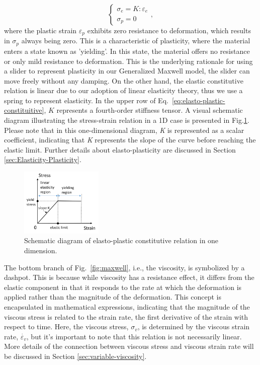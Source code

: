 \documentclass[10pt,journal,compsoc]{IEEEtran}
\begin{document}
\begin{equation}
	\begin{cases}
		\sigma_e = K:\varepsilon_e \\
		\sigma_p = 0
	\end{cases},\label{eq:elasto-plastic-constituitive}
\end{equation}
where the plastic strain $\varepsilon_{p}$ exhibits zero resistance to deformation, which results in $\sigma_{p}$ always being zero. This is a characteristic of plasticity, where the material enters a state known as 'yielding'. In this state, the material offers no resistance or only mild resistance to deformation. This is the underlying rationale for using a slider to represent plasticity in our Generalized Maxwell model, the slider can move freely without any damping. On the other hand, the elastic constitutive relation is linear due to our adoption of linear elasticity theory, thus we use a spring to represent elasticity. In the upper row of Eq.~\ref{eq:elasto-plastic-constituitive}, $\mathit{K}$ represents a fourth-order stiffness tensor. A visual schematic diagram illustrating the stress-strain relation in a 1D case is presented in Fig.\ref{fig:elasto-plastic-constitution}. Please note that in this one-dimensional diagram, \textit{K} is represented as a scalar coefficient, indicating that \textit{K} represents the slope of the curve before reaching the elastic limit. Further details about elasto-plasticity are discussed in Section \ref{sec:Elasticity-Plasticity}.


\begin{figure}[htbp]
	\centering
	\includegraphics[width=0.35\textwidth]{pics/elasto-plastic-constitution-diagram-1D.png}
	\caption{Schematic diagram of elasto-plastic constitutive relation in one dimension.}     \label{fig:elasto-plastic-constitution}
\end{figure}


The bottom branch of Fig.~\ref{fig:maxwell}, i.e., the viscosity, is symbolized by a dashpot. This is because while viscosity has a resistance effect, it differs from the elastic component in that it responds to the rate at which the deformation is applied rather than the magnitude of the deformation. This concept is encapsulated in mathematical expressions, indicating that the magnitude of the viscous stress is related to the strain rate, the first derivative of the strain with respect to time. Here, the viscous stress, $\sigma_{v}$, is determined by the viscous strain rate, $\dot{\varepsilon_{v}}$, but it's important to note that this relation is not necessarily linear.
More details of the connection between viscous stress and viscous strain rate will be discussed in Section \ref{sec:variable-viscosity}.
\end{document}

